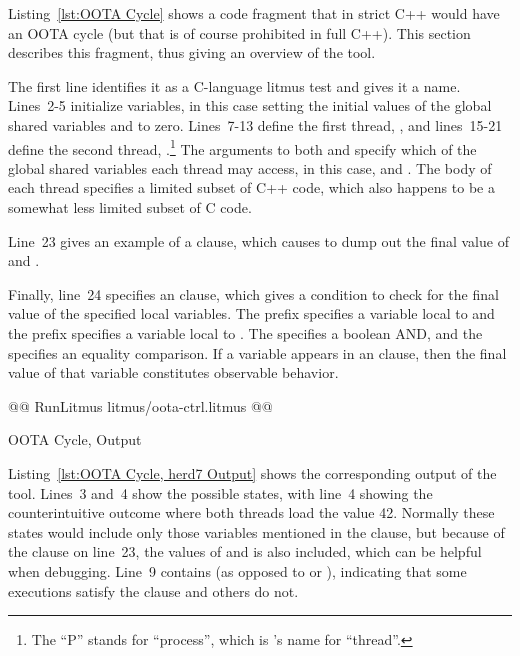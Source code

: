 \documentclass[10]{article}
\begin{document}
Listing~\ref{lst:OOTA Cycle}
shows a code fragment that in strict C++ would have an OOTA cycle (but
that is of course prohibited in full C++).
This section describes this fragment, thus giving an overview of
the  tool.

The first line identifies it as a C-language litmus test and gives it
a name.
Lines~2-5 initialize variables, in this case setting the initial
values of the global shared variables  and  to zero.
Lines~7-13 define the first thread, , and lines~15-21
define the second thread, .\footnote{
	The ``P'' stands for ``process'', which is 's name
	for ``thread''.}
The arguments to both  and  specify which of
the global shared variables each thread may access, in this case, 
and .
The body of each thread specifies a limited subset of C++ code,
which also happens to be a somewhat less limited subset of C code.

Line~23 gives an example of a  clause, which causes
 to dump out the final value of  and .

Finally, line~24 specifies an  clause, which gives a
condition to check for the final value of the specified local
variables.
The  prefix specifies a variable local to  and
the  prefix specifies a variable local to .
The \co{/\\} specifies a boolean AND, and the \co{=} specifies
an equality comparison.
If a variable appears in an  clause, then the final value of
that variable constitutes observable behavior.

\begin{listing}[tbp]
@@ RunLitmus litmus/oota-ctrl.litmus @@
\caption{OOTA Cycle,  Output}
\label{lst:OOTA Cycle, herd7 Output}
\end{listing}

Listing~\ref{lst:OOTA Cycle, herd7 Output} shows the corresponding output
of the  tool.
Lines~3 and~4 show the possible states, with line~4 showing the
counterintuitive outcome where both threads load the value 42.
Normally these states would include only those variables mentioned
in the  clause, but because of the  clause
on line~23, the values of  and  is also included, which
can be helpful when debugging.
Line~9 contains  (as opposed to  or ),
indicating that some executions satisfy the  clause and
others do not.
\end{document}
